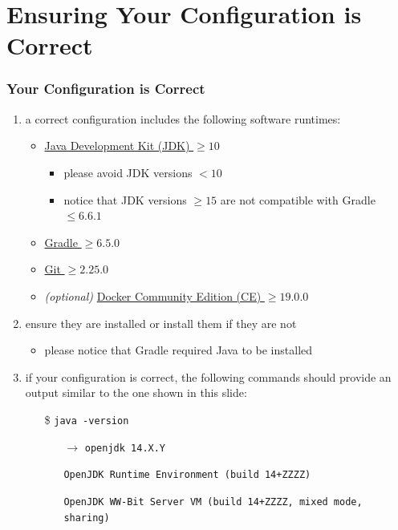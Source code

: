 \documentclass[handout]{beamer}\mode<presentation>{\usetheme{AMSCesenaPurpleAndGold}}
\begin{document}
\section{Ensuring Your Configuration is Correct}

\begin{frame}[c,allowframebreaks]
\frametitle{Your Configuration is Correct}

	\begin{enumerate}

    \item a correct configuration includes the following software runtimes:
    \begin{itemize}
        \item \href{https://www.oracle.com/java/technologies/javase-jdk14-downloads.html}{Java Development Kit (JDK) $\geq 10$} 
		\begin{itemize}
			\item \alert{please avoid JDK versions $< 10$}
			\item \alert{notice that JDK versions $\geq 15$ are not compatible with Gradle $\leq 6.6.1$}
		\end{itemize}
        \item \href{https://gradle.org/releases}{Gradle $\geq 6.5.0$}
        \item \href{https://git-scm.com}{Git $\geq 2.25.0$}
    	\item \emph{(optional)} \href{https://www.docker.com/products/docker-desktop}{Docker Community Edition (CE) $\geq 19.0.0$}
    \end{itemize}

	\item ensure they are installed or install them if they are not
	\begin{itemize}
		\item please notice that Gradle required Java to be installed
	\end{itemize}
    
    \framebreak
    
    \item if your configuration is correct, the following commands should provide an output similar to the one shown in this slide:
    \begin{itemize}
        \item[\$] \texttt{java -version}
        \begin{itemize}
            \item[$\rightarrow$] \texttt{openjdk 14.X.Y}
            \item[] \texttt{OpenJDK Runtime Environment (build 14+ZZZZ)}
            \item[] \texttt{OpenJDK WW-Bit Server VM (build 14+ZZZZ, mixed mode, sharing)}
        \end{itemize}
        

\end{itemize}
\end{enumerate}
\end{frame}
\end{document}

